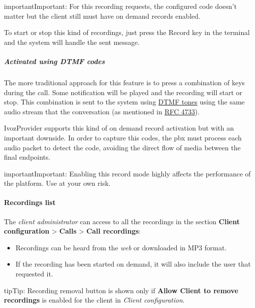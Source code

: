 \documentclass[letterpaper,10pt,english]{sphinxmanual}
\begin{document}
\begin{notice}{important}{Important:}
For this recording requests, the configured code doesn't matter
but the client still must have on demand records enabled.
\end{notice}

To start or stop this kind of recordings, just press the Record key in the
terminal and the system will handle the sent message.


\subparagraph{Activated using \emph{DTMF} codes}
\label{administration_portal/client/vpbx/calls/call_recordings:activated-using-dtmf-codes}
The more traditional approach for this feature is to press a combination of
keys during the call. Some notification will be played and the recording will
start or stop. This combination is sent to the system using \href{https://es.wikipedia.org/wiki/Marcaci\%C3\%B3n\_por\_tonos}{DTMF tones} using the same audio
stream that the conversation (as mentioned in \href{https://tools.ietf.org/html/rfc4733}{RFC 4733}).

IvozProvider supports this kind of on demand record activation but with an
important downside. In order to capture this codes, the pbx must process each
audio packet to detect the code, avoiding the direct flow of media between the
final endpoints.

\begin{notice}{important}{Important:}
Enabling this record mode highly affects the performance of the
platform. Use at your own risk.
\end{notice}


\paragraph{Recordings list}
\label{administration_portal/client/vpbx/calls/call_recordings:recordings-list}
The \emph{client administrator} can access to all the recordings in the section
\textbf{Client configuration} \textgreater{} \textbf{Calls} \textgreater{} \textbf{Call recordings}:
\begin{itemize}
\item {} 
Recordings can be heard from the \emph{web} or downloaded in MP3 format.

\item {} 
If the recording has been started on demand, it will also include the user
that requested it.

\end{itemize}

\begin{notice}{tip}{Tip:}
Recording removal button is shown only if \textbf{Allow Client to remove recordings} is enabled
for the client in \emph{Client configuration}.
\end{notice}
\end{document}
